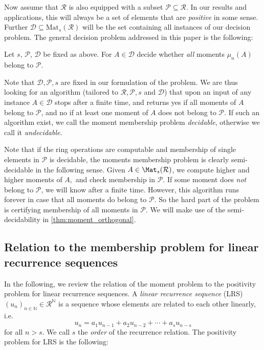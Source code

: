 Now assume that $\mathcal R$ is also equipped with a subset $\mathcal P \subseteq \mathcal R$. In our results and applications, this  will always be a set of  elements that are {\it positive} in some sense. Further $\mathcal D\subseteq\mathrm{Mat}_s(\mathcal R)$ will be the set containing all instances of our decision problem. The general decision problem addressed in this paper is the following:

\begin{problem}\label{prob:moment_problem}
 Let $s$, $\mathcal{P}$, $\mathcal{D}$ be fixed as above.
For $A\in \mathcal D$ decide whether \emph{all} moments $\mu_n(A)$ belong to $\mathcal P$.
\end{problem}

Note that $\mathcal D,\mathcal P, s$ are fixed in our formulation of the problem. We are thus looking for an algorithm (tailored to $\mathcal R,\mathcal P, s$ and $\mathcal{D}$) that upon an input of any instance $A\in\mathcal D$ stops after a finite time, and returns yes if all moments of $A$ belong to $\mathcal P$, and no if at least one moment of $A$ does not belong to $\mathcal P$. If such an algorithm exist, we call the moment membership problem  \emph{decidable}, otherwise we call it \emph{undecidable}.

Note that if the ring operations are computable and membership of single elements in $\mathcal P$ is decidable, the moments membership problem is clearly semi-decidable in the following sense. Given $A\in \Mat_s(\mathcal R)$, we compute higher and higher moments of $A,$ and check membership in $\mathcal P$. If some moment does {\it not} belong to $\mathcal P$, we will know after a finite time. However, this algorithm runs forever in case that all moments do belong to $\mathcal P$. So the hard part of the problem is certifying membership of all moments in $\mathcal P$. We will make use of the semi-decidability in \cref{thm:moment_orthogonal}.


\subsection{Relation to the membership problem for linear recurrence sequences}

In the following, we review the relation of the moment problem to the positivity problem for linear recurrence sequences. 
A \emph{linear recurrence sequence} (LRS) $(u_n)_{n \in \mathbb{N}} \in \mathcal{R}^{\mathbb{N}}$ is a sequence whose elements are related to each other linearly, i.e.\
\begin{equation}\label{eq:LRS}
u_n = a_1 u_{n-1} + a_2 u_{n-2} + \cdots + a_s u_{n-s}
\end{equation}
for  all $n>s$. We call $s$ the \emph{order} of the recurrence relation. The positivity  problem for LRS is the following:

